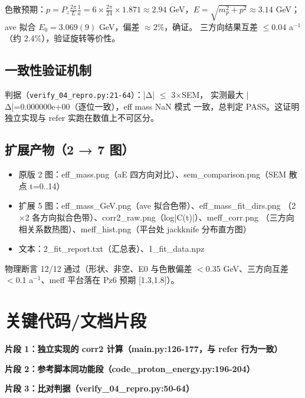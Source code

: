 \documentclass[UTF8]{ctexart}
\begin{document}
色散预期：$p=P_z\frac{2\pi}{L}\frac1a=6\times\frac{2\pi}{24}\times1.871
\approx2.94$ GeV，$E=\sqrt{m_p^2+p^2}\approx3.14$ GeV；
ave 拟合 $E_0=3.069(9)$ GeV，偏差 $\approx2\%$，\textcolor{struct}{确证}。
三方向结果互差 $\le0.04$ a$^{-1}$（约 2.4\%），验证旋转等价性。

\subsection{一致性验证机制}
判据（\texttt{verify\_04\_repro.py:21-64}）：|Δ| $\le$ 3$\times$SEM，
实测最大 |Δ|=0.000000e+00（\textcolor{struct}{逐位一致}），eff mass NaN 模式
一致，总判定 PASS。这证明独立实现与 refer 实跑在数值上不可区分。
\subsection{扩展产物（2 → 7 图）}
\begin{itemize}
  \item 原版 2 图：eff\_mass.png（aE 四方向对比）、sem\_comparison.png（SEM 散点 t=0..14）
  \item 扩展 5 图：eff\_mass\_GeV.png（ave 拟合色带）、eff\_mass\_fit\_dirs.png
    （2$\times$2 各方向拟合色带）、corr2\_raw.png（log|C(t)|）、meff\_corr.png
    （三方向相关系数热图）、meff\_hist.png（平台处 jackknife 分布直方图）
  \item 文本：2\_fit\_report.txt（汇总表）、1\_fit\_data.npz
\end{itemize}
物理断言 12/12 通过（形状、非空、E0 与色散偏差 $<$0.35 GeV、三方向互差
$<$0.1 a$^{-1}$、meff 平台落在 Pz6 预期 [1.3,1.8]）。

\section{关键代码/文档片段}
\textbf{片段 1：独立实现的 corr2 计算（main.py:126-177，与 refer 行为一致）}

\textbf{片段 2：参考脚本同功能段（code\_proton\_energy.py:196-204）}

\textbf{片段 3：比对判据（verify\_04\_repro.py:50-64）}


\end{document}
